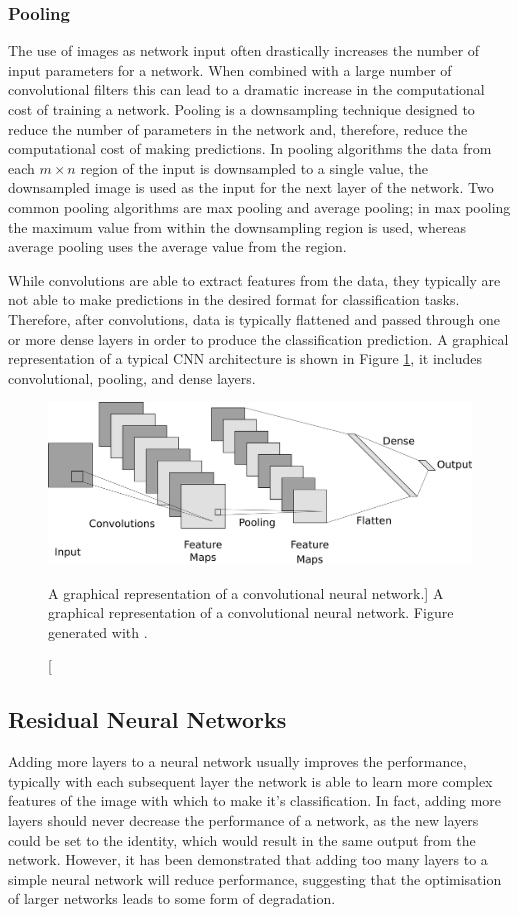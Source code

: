\subsubsection*{Pooling}
The use of images as network input often drastically increases the number of
input parameters for a network. When combined with a large number of
convolutional filters this can lead to a dramatic increase in the computational
cost of training a network. Pooling\cite{5537907} is a downsampling technique 
designed to reduce the number of parameters in the network and, therefore, 
reduce the computational cost of making predictions. In pooling algorithms
the data from each $m \times n$ region of the input is downsampled to a single 
value, the downsampled image is used as the input for the next layer of the 
network. Two common pooling algorithms are max pooling and average pooling; in 
max pooling the maximum value from within the downsampling region is used, 
whereas average pooling uses the average value from the region.

\bigskip\noindent
While convolutions are able to extract features from the data, they typically
are not able to make predictions in the desired format for classification tasks.
Therefore, after convolutions, data is typically flattened and passed through
one or more dense layers in order to produce the classification prediction. A
graphical representation of a typical CNN architecture is shown in Figure
\ref{fig:cnn_layer}, it includes convolutional, pooling, and dense layers.
\begin{figure}
	\centering
	\includegraphics[width = \textwidth]{figures/cnn_layer.png}
	\caption
	[A graphical representation of a convolutional neural network.]
	{ A graphical representation of a convolutional neural network. Figure
	generated with \cite{cnn_diagrams}.}
	\label{fig:cnn_layer}
\end{figure}

\subsection{Residual Neural Networks}
Adding more layers to a neural network usually improves the performance,
typically with each subsequent layer the network is able to learn more complex 
features of the image with which to make it's classification. In fact, adding 
more layers should never decrease the performance of a network, as the new 
layers could be set to the identity, which would result in the same output 
from the network. However, it has been demonstrated that adding too many 
layers to a simple neural network will reduce performance, suggesting that the 
optimisation of larger networks leads to some form of 
degradation\cite{He_2016_CVPR}.


